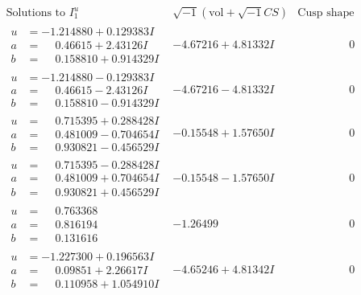 \documentclass[1p]{elsarticle_modified}
\theoremstyle{definition}
\newcommand{\I}{\sqrt{-1}}
\begin{document}
$$\begin{array}{c|c|c}
\text{Solutions to }I^u_{1}& \I (\text{vol} + \sqrt{-1}CS) & \text{Cusp shape}\\
 \hline 
\begin{aligned}
u &= -1.214880 + 0.129383 I \\
a &= \phantom{-}0.46615 + 2.43126 I \\
b &= \phantom{-}0.158810 + 0.914329 I\end{aligned}
 & -4.67216 + 4.81332 I & \phantom{-0.000000 } 0 \\ \hline\begin{aligned}
u &= -1.214880 - 0.129383 I \\
a &= \phantom{-}0.46615 - 2.43126 I \\
b &= \phantom{-}0.158810 - 0.914329 I\end{aligned}
 & -4.67216 - 4.81332 I & \phantom{-0.000000 } 0 \\ \hline\begin{aligned}
u &= \phantom{-}0.715395 + 0.288428 I \\
a &= \phantom{-}0.481009 - 0.704654 I \\
b &= \phantom{-}0.930821 - 0.456529 I\end{aligned}
 & -0.15548 + 1.57650 I & \phantom{-0.000000 } 0 \\ \hline\begin{aligned}
u &= \phantom{-}0.715395 - 0.288428 I \\
a &= \phantom{-}0.481009 + 0.704654 I \\
b &= \phantom{-}0.930821 + 0.456529 I\end{aligned}
 & -0.15548 - 1.57650 I & \phantom{-0.000000 } 0 \\ \hline\begin{aligned}
u &= \phantom{-}0.763368\phantom{ +0.000000I} \\
a &= \phantom{-}0.816194\phantom{ +0.000000I} \\
b &= \phantom{-}0.131616\phantom{ +0.000000I}\end{aligned}
 & -1.26499\phantom{ +0.000000I} & \phantom{-0.000000 } 0 \\ \hline\begin{aligned}
u &= -1.227300 + 0.196563 I \\
a &= \phantom{-}0.09851 + 2.26617 I \\
b &= \phantom{-}0.110958 + 1.054910 I\end{aligned}
 & -4.65246 + 4.81342 I & \phantom{-0.000000 } 0 \\ \hline\begin{aligned}

\end{aligned}
\end{array}$$
\end{document}
